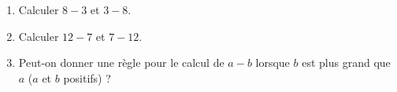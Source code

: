 
\begin{exercice}\label{exo2smath-0105}

\begin{enumerate}
    \item
        Calculer \( 8-3\) et \( 3-8\).
    \item
        Calculer \( 12-7\) et \( 7-12\).
    \item
        Peut-on donner une règle pour le calcul de \( a-b\) lorsque \( b\) est plus grand que \( a\) (\( a\) et \( b\) positifs) ?
\end{enumerate}

\end{exercice}
